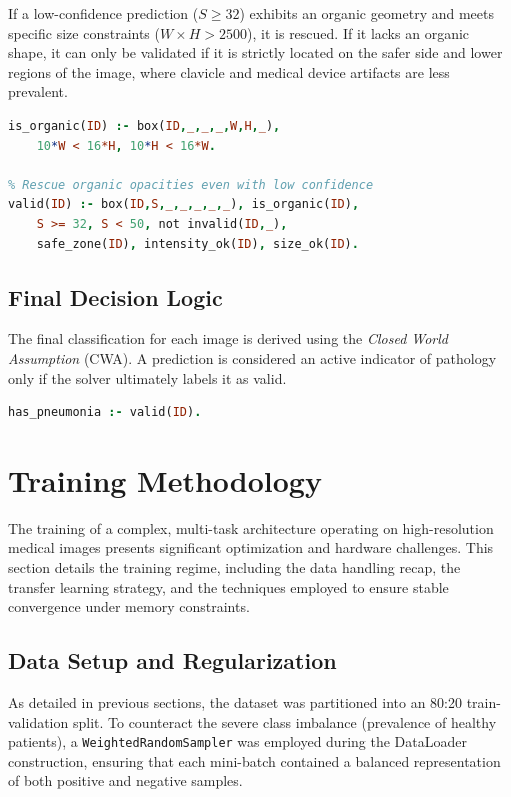 \documentclass[a4paper,fleqn]{cas-dc}
\begin{document}
If a low-confidence prediction ($S \ge 32$) exhibits an organic geometry and meets specific size constraints ($W \times H > 2500$), it is rescued. If it lacks an organic shape, it can only be validated if it is strictly located on the safer side and lower regions of the image, where clavicle and medical device artifacts are less prevalent.

\begin{lstlisting}[language=Prolog]
% Define organic shape bounds
is_organic(ID) :- box(ID,_,_,_,W,H,_), 
	10*W < 16*H, 10*H < 16*W.
	
% Rescue organic opacities even with low confidence
valid(ID) :- box(ID,S,_,_,_,_,_), is_organic(ID), 
	S >= 32, S < 50, not invalid(ID,_), 
	safe_zone(ID), intensity_ok(ID), size_ok(ID).
\end{lstlisting}

\subsection{Final Decision Logic}
The final classification for each image is derived using the \textit{Closed World Assumption} (CWA). A prediction is considered an active indicator of pathology only if the solver ultimately labels it as valid.

\begin{lstlisting}[language=Prolog]	
% Final Image Classification
has_pneumonia :- valid(ID).
\end{lstlisting}
	
\section{Training Methodology}

The training of a complex, multi-task architecture operating on high-resolution medical images presents significant optimization and hardware challenges. This section details the training regime, including the data handling recap, the transfer learning strategy, and the techniques employed to ensure stable convergence under memory constraints.

\subsection{Data Setup and Regularization}
As detailed in previous sections, the dataset was partitioned into an 80:20 train-validation split. To counteract the severe class imbalance (prevalence of healthy patients), a \texttt{WeightedRandomSampler} was employed during the DataLoader construction, ensuring that each mini-batch contained a balanced representation of both positive and negative samples. 
\end{document}
